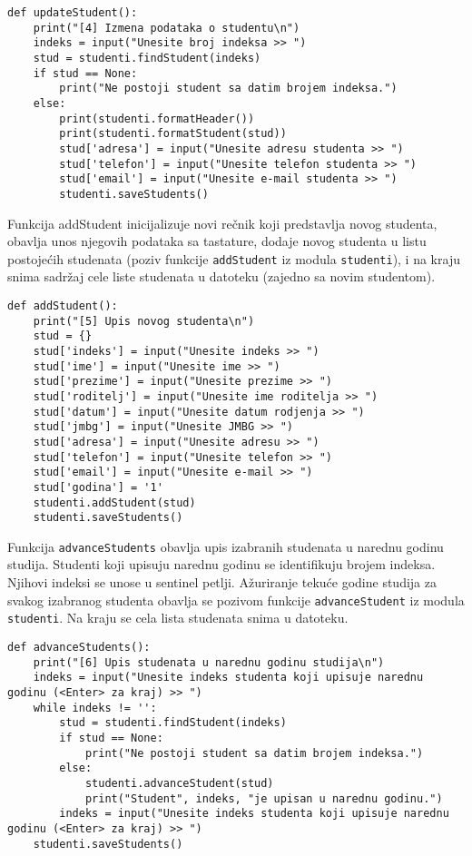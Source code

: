 \documentclass[a4paper]{article}
\begin{document}
\begin{verbatim}
def updateStudent():
    print("[4] Izmena podataka o studentu\n")
    indeks = input("Unesite broj indeksa >> ")
    stud = studenti.findStudent(indeks)
    if stud == None:
        print("Ne postoji student sa datim brojem indeksa.")
    else:
        print(studenti.formatHeader())
        print(studenti.formatStudent(stud))
        stud['adresa'] = input("Unesite adresu studenta >> ")
        stud['telefon'] = input("Unesite telefon studenta >> ")
        stud['email'] = input("Unesite e-mail studenta >> ")
        studenti.saveStudents()
\end{verbatim}

Funkcija addStudent inicijalizuje novi rečnik koji predstavlja novog studenta,
obavlja unos njegovih podataka sa tastature, dodaje novog studenta u listu
postojećih studenata (poziv funkcije \texttt{addStudent} iz modula
\texttt{studenti}), i na kraju snima sadržaj cele liste studenata u datoteku
(zajedno sa novim studentom).

\begin{verbatim}
def addStudent():
    print("[5] Upis novog studenta\n")
    stud = {}
    stud['indeks'] = input("Unesite indeks >> ")
    stud['ime'] = input("Unesite ime >> ")
    stud['prezime'] = input("Unesite prezime >> ")
    stud['roditelj'] = input("Unesite ime roditelja >> ")
    stud['datum'] = input("Unesite datum rodjenja >> ")
    stud['jmbg'] = input("Unesite JMBG >> ")
    stud['adresa'] = input("Unesite adresu >> ")
    stud['telefon'] = input("Unesite telefon >> ")
    stud['email'] = input("Unesite e-mail >> ")
    stud['godina'] = '1'
    studenti.addStudent(stud)
    studenti.saveStudents()
\end{verbatim}

Funkcija \texttt{advanceStudents} obavlja upis izabranih studenata u narednu
godinu studija. Studenti koji upisuju narednu godinu se identifikuju brojem
indeksa. Njihovi indeksi se unose u sentinel petlji. Ažuriranje tekuće godine
studija za svakog izabranog studenta obavlja se pozivom funkcije
\texttt{advanceStudent} iz modula \texttt{studenti}. Na kraju se cela lista
studenata snima u datoteku.

\begin{verbatim}
def advanceStudents():
    print("[6] Upis studenata u narednu godinu studija\n")
    indeks = input("Unesite indeks studenta koji upisuje narednu godinu (<Enter> za kraj) >> ")
    while indeks != '':
        stud = studenti.findStudent(indeks)
        if stud == None:
            print("Ne postoji student sa datim brojem indeksa.")
        else:
            studenti.advanceStudent(stud)
            print("Student", indeks, "je upisan u narednu godinu.")
        indeks = input("Unesite indeks studenta koji upisuje narednu godinu (<Enter> za kraj) >> ")
    studenti.saveStudents()
\end{verbatim}
\end{document}
